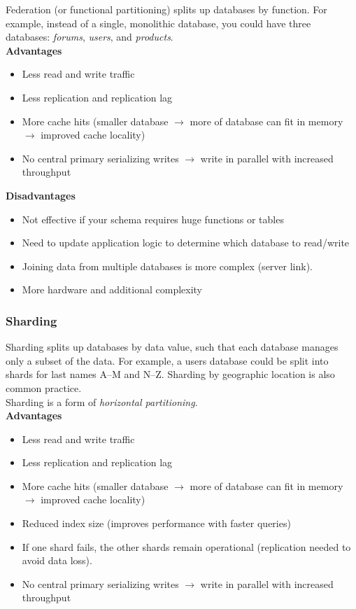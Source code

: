 \documentclass[12pt, titlepage]{article}
\begin{document}
Federation (or functional partitioning) splits up databases by function. For example, instead of a single, monolithic database, you could have three databases: \textit{forums}, \textit{users}, and \textit{products}. \\

\textbf{Advantages}
\begin{itemize}
  \item Less read and write traffic
  \item Less replication and replication lag
  \item More cache hits (smaller database $\rightarrow$ more of database can fit in memory $\rightarrow$ improved cache locality)
  \item No central primary serializing writes $\rightarrow$ write in parallel with increased throughput \\
\end{itemize}

\textbf{Disadvantages}
\begin{itemize}
  \item Not effective if your schema requires huge functions or tables
  \item Need to update application logic to determine which database to read/write
  \item Joining data from multiple databases is more complex (server link).
  \item More hardware and additional complexity
\end{itemize}

\subsubsection{Sharding}

Sharding splits up databases by data value, such that each database manages only a subset of the data. For example, a users database could be split into shards for last names A--M and N--Z. Sharding by geographic location is also common practice. \\

Sharding is a form of \textit{horizontal partitioning}. \\

\textbf{Advantages}
\begin{itemize}
  \item Less read and write traffic
  \item Less replication and replication lag
  \item More cache hits (smaller database $\rightarrow$ more of database can fit in memory $\rightarrow$ improved cache locality)
  \item Reduced index size (improves performance with faster queries)
  \item If one shard fails, the other shards remain operational (replication needed to avoid data loss).
  \item No central primary serializing writes $\rightarrow$ write in parallel with increased throughput \\
\end{itemize}
\end{document}
